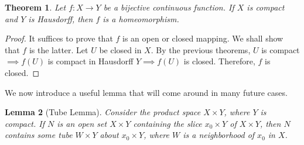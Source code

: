 \documentclass{article}
\newtheorem{theorem}{Theorem}[section]
\newtheorem{lemma}[theorem]{Lemma}
\theoremstyle{remark}
\theoremstyle{definition}
\begin{document}
\begin{theorem}
Let $f: X \longrightarrow Y$ be a bijective continuous function. If $X$ is compact and $Y$ is Hausdorff, then $f$ is a homeomorphism. 
\end{theorem}
\begin{proof}
It suffices to prove that $f$ is an open or closed mapping. We shall show that $f$ is the latter. Let $U$ be closed in $X$. By the previous theorems, $U$ is compact $\implies f(U)$ is compact in Hausdorff $Y \implies f(U)$ is closed. Therefore, $f$ is closed. 
\end{proof}

We now introduce a useful lemma that will come around in many future cases. 

\begin{lemma}[Tube Lemma]
Consider the product space $X \times Y$, where $Y$ is compact. If $N$ is an open set $X \times Y$ containing the slice $x_0 \times Y$ of $X \times Y$, then $N$ contains some tube $W \times Y$ about $x_0 \times Y$, where $W$ is a neighborhood of $x_0$ in $X$. 
\end{lemma}
\begin{center}
\end{center}
\end{document}
